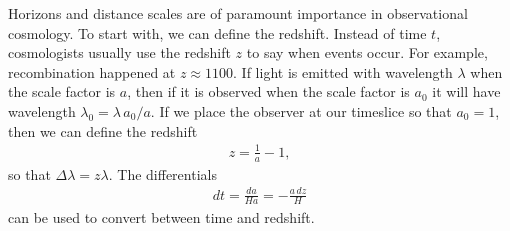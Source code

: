 \documentclass[12pt]{article}
\renewcommand{\th}[1]{\frac{1}{#1}}
\begin{document}

Horizons and distance scales are of paramount importance in observational cosmology. To start with, we can define the redshift. Instead of time $t$, cosmologists usually use the redshift $z$ to say when events occur. For example, recombination happened at $z \approx 1100$. If light is emitted with wavelength $\lambda$ when the scale factor is $a$, then if it is observed when the scale factor is $a_0$ it will have wavelength $\lambda_0 = \lambda\, a_0/a$. If we place the observer at our timeslice so that $a_0=1$, then we can define the redshift
\begin{align}
z = \th{a}-1, \label{eqn:redshift}
\end{align}
so that $\Delta\lambda = z\lambda$. The differentials
\begin{align}
dt = \frac{da}{Ha} = -\frac{a\,dz}{H}
\end{align}
can be used to convert between time and redshift.
\end{document}

